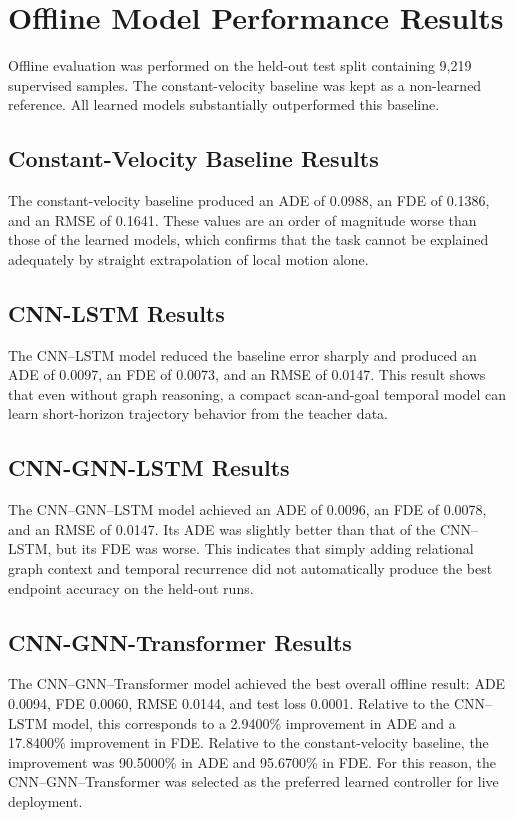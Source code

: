 \section{Offline Model Performance Results}

Offline evaluation was performed on the held-out test split containing 9,219 supervised samples. The constant-velocity baseline was kept as a non-learned reference. All learned models substantially outperformed this baseline.

\subsection{Constant-Velocity Baseline Results}

The constant-velocity baseline produced an ADE of 0.0988, an FDE of 0.1386, and an RMSE of 0.1641. These values are an order of magnitude worse than those of the learned models, which confirms that the task cannot be explained adequately by straight extrapolation of local motion alone.

\subsection{CNN-LSTM Results}

The CNN--LSTM model reduced the baseline error sharply and produced an ADE of 0.0097, an FDE of 0.0073, and an RMSE of 0.0147. This result shows that even without graph reasoning, a compact scan-and-goal temporal model can learn short-horizon trajectory behavior from the teacher data.

\subsection{CNN-GNN-LSTM Results}

The CNN--GNN--LSTM model achieved an ADE of 0.0096, an FDE of 0.0078, and an RMSE of 0.0147. Its ADE was slightly better than that of the CNN--LSTM, but its FDE was worse. This indicates that simply adding relational graph context and temporal recurrence did not automatically produce the best endpoint accuracy on the held-out runs.

\subsection{CNN-GNN-Transformer Results}

The CNN--GNN--Transformer model achieved the best overall offline result: ADE 0.0094, FDE 0.0060, RMSE 0.0144, and test loss 0.0001. Relative to the CNN--LSTM model, this corresponds to a 2.9400\% improvement in ADE and a 17.8400\% improvement in FDE. Relative to the constant-velocity baseline, the improvement was 90.5000\% in ADE and 95.6700\% in FDE. For this reason, the CNN--GNN--Transformer was selected as the preferred learned controller for live deployment.

